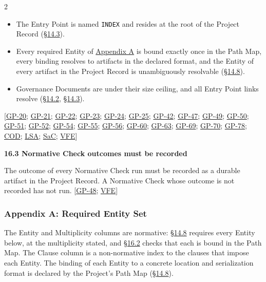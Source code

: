 \begin{multicols}{2}
\begin{itemize}
\item The Entry Point is named \texttt{INDEX} and resides at the root of the Project Record (\hyperlink{nss-14.3}{\S14.3}).

\item Every required Entity of \hyperlink{nss-appA}{Appendix A} is bound exactly once in the Path Map, every binding resolves to artifacts in the declared format, and the Entity of every artifact in the Project Record is unambiguously resolvable (\hyperlink{nss-14.8}{\S14.8}).

\item Governance Documents are under their size ceiling, and all Entry Point links resolve (\hyperlink{nss-14.2}{\S14.2}, \hyperlink{nss-14.3}{\S14.3}).

\end{itemize}

[\hyperlink{gp-20}{GP-20}; \hyperlink{gp-21}{GP-21}; \hyperlink{gp-22}{GP-22}; \hyperlink{gp-23}{GP-23}; \hyperlink{gp-24}{GP-24}; \hyperlink{gp-25}{GP-25}; \hyperlink{gp-42}{GP-42}; \hyperlink{gp-47}{GP-47}; \hyperlink{gp-49}{GP-49}; \hyperlink{gp-50}{GP-50}; \hyperlink{gp-51}{GP-51}; \hyperlink{gp-52}{GP-52}; \hyperlink{gp-54}{GP-54}; \hyperlink{gp-55}{GP-55}; \hyperlink{gp-56}{GP-56}; \hyperlink{gp-60}{GP-60}; \hyperlink{gp-63}{GP-63}; \hyperlink{gp-69}{GP-69}; \hyperlink{gp-70}{GP-70}; \hyperlink{gp-78}{GP-78}; \hyperlink{gp-COD}{COD}; \hyperlink{gp-LSA}{LSA}; \hyperlink{gp-SaC}{SaC}; \hyperlink{gp-VFE}{VFE}]

\hypertarget{nss-16.3}{}

\par\smallskip\noindent\textbf{16.3 Normative Check outcomes must be recorded}\par\nopagebreak

The outcome of every Normative Check run must be recorded as a durable artifact in the Project Record. A Normative Check whose outcome is not recorded has not run. [\hyperlink{gp-48}{GP-48}; \hyperlink{gp-VFE}{VFE}]

\hypertarget{nss-appA}{}

\subsubsection*{Appendix A: Required Entity Set}

The Entity and Multiplicity columns are normative: \hyperlink{nss-14.8}{\S14.8} requires every Entity below, at the multiplicity stated, and \hyperlink{nss-16.2}{\S16.2} checks that each is bound in the Path Map. The Clause column is a non-normative index to the clauses that impose each Entity. The binding of each Entity to a concrete location and serialization format is declared by the Project's Path Map (\hyperlink{nss-14.8}{\S14.8}).

\end{multicols}

